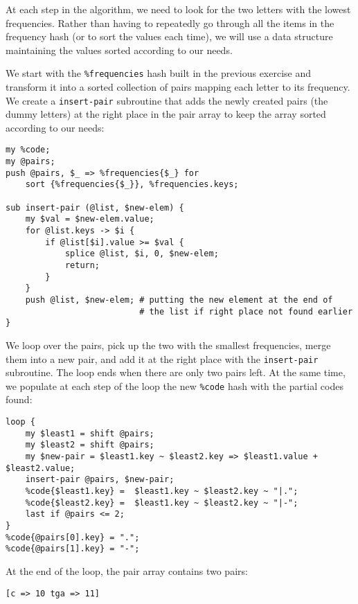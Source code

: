 At each step in the algorithm, we need to look for 
the two letters with the lowest frequencies. Rather than 
having to repeatedly go through all the items in the 
frequency hash (or to sort the values each time), we 
will use a data structure maintaining the values 
sorted according to our needs.

We start with the \verb'%frequencies' hash built in the 
previous exercise and transform it into a sorted collection 
of pairs mapping each letter to its frequency. We create 
a {\tt insert-pair} subroutine that adds the newly created 
pairs (the dummy letters) at the right place in the pair array 
to keep the array sorted according to our needs:

\begin{verbatim}
my %code;
my @pairs;
push @pairs, $_ => %frequencies{$_} for 
    sort {%frequencies{$_}}, %frequencies.keys;

sub insert-pair (@list, $new-elem) {
    my $val = $new-elem.value;
    for @list.keys -> $i {
        if @list[$i].value >= $val {
            splice @list, $i, 0, $new-elem;
            return;
        }
    }
    push @list, $new-elem; # putting the new element at the end of 
                           # the list if right place not found earlier
}
\end{verbatim}

We loop over the pairs, pick up the two with the smallest 
frequencies, merge them into a new pair, and add it at the right 
place with the {\tt insert-pair} subroutine. The loop ends when 
there are only two pairs left. At the same time, we populate at 
each step of the loop the new \verb'%code' hash with the partial codes 
found:

\begin{verbatim}
loop {
    my $least1 = shift @pairs;
    my $least2 = shift @pairs;
    my $new-pair = $least1.key ~ $least2.key => $least1.value + $least2.value;
    insert-pair @pairs, $new-pair;
    %code{$least1.key} =  $least1.key ~ $least2.key ~ "|.";
    %code{$least2.key} =  $least1.key ~ $least2.key ~ "|-";
    last if @pairs <= 2;
}
%code{@pairs[0].key} = ".";
%code{@pairs[1].key} = "-";
\end{verbatim}

At the end of the loop, the pair array contains two pairs:

\begin{verbatim}
[c => 10 tga => 11]
\end{verbatim}

